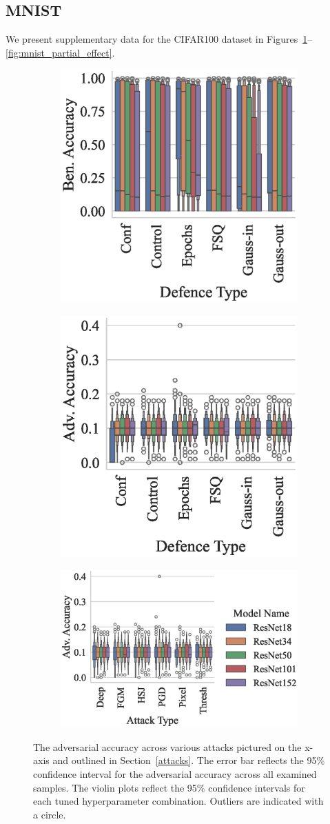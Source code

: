 \clearpage
\subsection{MNIST}
We present supplementary data for the CIFAR100 dataset in Figures~\ref{fig:mnist_accuracies}--\ref{fig:mnist_partial_effect}.

\begin{figure}[!h]
\begin{subfigure}
    \centering
    \includegraphics[trim={0 5pt 0 10pt},clip,width=.27\textwidth]{mnist/ben_accuracy_vs_defence_type.eps}
\end{subfigure}
\begin{subfigure}
    \centering
    \includegraphics[trim={0 5pt 0 10pt},clip,width=.27\textwidth]{mnist/adv_accuracy_vs_defence_type.eps}
\end{subfigure}
\begin{subfigure}
    \centering
    \includegraphics[trim={0 5pt 0 10pt},clip,width=.4\textwidth]{mnist/adv_accuracy_vs_attack_type.eps}
\end{subfigure}
\caption{The adversarial accuracy across various attacks pictured on the x-axis and outlined in Section~\ref{attacks}. The error bar reflects the 95\% confidence interval for the adversarial accuracy across all examined samples. The violin plots reflect the 95\% confidence intervals for each tuned hyperparameter combination. Outliers are indicated with a circle.}
\label{fig:mnist_accuracies}
\end{figure}

